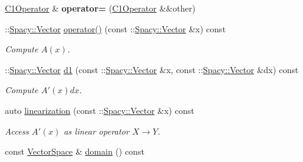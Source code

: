 \begin{DoxyCompactItemize}
\item 
\hyperlink{classSpacy_1_1FEniCS_1_1C1Operator}{C1\+Operator} \& {\bfseries operator=} (\hyperlink{classSpacy_1_1FEniCS_1_1C1Operator}{C1\+Operator} \&\&other)\hypertarget{classSpacy_1_1FEniCS_1_1C1Operator_ae611721c1f172413877c91a3e99ae69b}{}\label{classSpacy_1_1FEniCS_1_1C1Operator_ae611721c1f172413877c91a3e99ae69b}

\item 
\+::\hyperlink{classSpacy_1_1Vector}{Spacy\+::\+Vector} \hyperlink{classSpacy_1_1FEniCS_1_1C1Operator_a5e2b3831a7583793f6c134eedd2be9bc}{operator()} (const \+::\hyperlink{classSpacy_1_1Vector}{Spacy\+::\+Vector} \&x) const \hypertarget{classSpacy_1_1FEniCS_1_1C1Operator_a5e2b3831a7583793f6c134eedd2be9bc}{}\label{classSpacy_1_1FEniCS_1_1C1Operator_a5e2b3831a7583793f6c134eedd2be9bc}

\begin{DoxyCompactList}\small\item\em Compute $A(x)$. \end{DoxyCompactList}\item 
\+::\hyperlink{classSpacy_1_1Vector}{Spacy\+::\+Vector} \hyperlink{classSpacy_1_1FEniCS_1_1C1Operator_a610d7a4a5daec3b512ab3ccf46a7b9e9}{d1} (const \+::\hyperlink{classSpacy_1_1Vector}{Spacy\+::\+Vector} \&x, const \+::\hyperlink{classSpacy_1_1Vector}{Spacy\+::\+Vector} \&dx) const \hypertarget{classSpacy_1_1FEniCS_1_1C1Operator_a610d7a4a5daec3b512ab3ccf46a7b9e9}{}\label{classSpacy_1_1FEniCS_1_1C1Operator_a610d7a4a5daec3b512ab3ccf46a7b9e9}

\begin{DoxyCompactList}\small\item\em Compute $A'(x)dx$. \end{DoxyCompactList}\item 
auto \hyperlink{classSpacy_1_1FEniCS_1_1C1Operator_aab603c2b35f2b710b2e646cf3fb7ee9c}{linearization} (const \+::\hyperlink{classSpacy_1_1Vector}{Spacy\+::\+Vector} \&x) const 
\begin{DoxyCompactList}\small\item\em Access $A'(x)$ as linear operator $X\rightarrow Y$. \end{DoxyCompactList}\item 
const \hyperlink{classSpacy_1_1VectorSpace}{Vector\+Space} \& \hyperlink{classSpacy_1_1OperatorBase_a2588f9b3e0188820c4c494e63293dc6f}{domain} () const \hypertarget{classSpacy_1_1OperatorBase_a2588f9b3e0188820c4c494e63293dc6f}{}\label{classSpacy_1_1OperatorBase_a2588f9b3e0188820c4c494e63293dc6f}


\end{DoxyCompactItemize}
